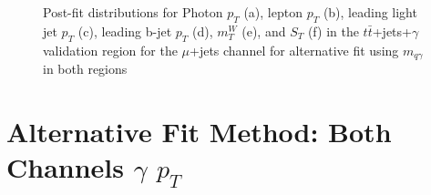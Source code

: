\begin{figure}[]
\hfil  
{}
\caption{Post-fit distributions for Photon $p_T$ (a), lepton $p_T$ (b), leading light jet $p_T$ (c), leading b-jet $p_T$ (d),  $m_T^W$  (e), and $S_T$ (f) in the $t\bar{t}$+jets+$\gamma$ validation region for the $\mu$+jets channel for alternative fit using  $m_{q\gamma}$ in both regions}
\end{figure}


\section{Alternative Fit Method: Both Channels $\gamma$ $p_T$}
\label{sec:addfitel}

